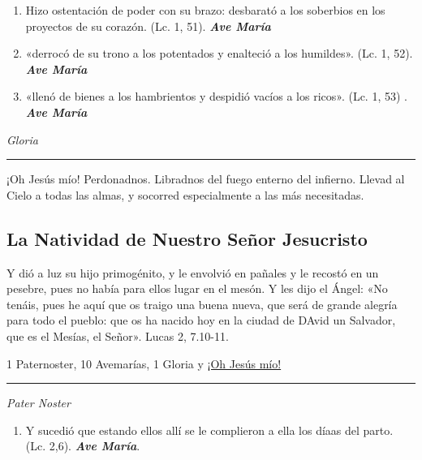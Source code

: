 \documentclass[a4paper,11pt, oneside]{report}
\begin{document}
{{\begin{enumerate}
      \item Hizo ostentación de poder con su brazo: desbarató a los soberbios en los proyectos de su corazón. (Lc. 1, 51). \textbf{\textit{Ave María}}

      \item «derrocó de su trono a los potentados y enalteció a los humildes». (Lc. 1, 52). \textbf{\textit{Ave María}}

      \item «llenó de bienes a los hambrientos y despidió vacíos a los ricos». (Lc. 1, 53) .    \textbf{\textit{Ave María}}
    \end{enumerate}

    \indent\textit{Gloria}

    \begin{center}\rule{1\linewidth}{\linethickness}\end{center}

    \hypertarget{finalVisitacion}{¡Oh Jesús mío! Perdonadnos. Libradnos del fuego enterno del infierno. Llevad al Cielo a todas las almas, y socorred especialmente a las más 
    necesitadas.}
  }
                      
  \subsection*{La Natividad de Nuestro Señor Jesucristo}
  {

    Y dió a luz su hijo primogénito, y le envolvió en pañales y le recostó en un pesebre, pues no había para ellos lugar en el mesón.
    Y les dijo el Ángel: «No tenáis, pues he aquí que os traigo una buena nueva, que será de grande alegría para todo el pueblo: que os ha nacido hoy en la ciudad de DAvid
    un Salvador, que es el Mesías, el Señor». Lucas 2, 7.10-11.
    
    \medskip
    
    1 Paternoster, 10 Avemarías, 1 Gloria y \hyperlink{finalNatividad}{¡Oh Jesús mío!}
    
    \medskip

    \begin{center}\rule{1\linewidth}{\linethickness}\end{center}

    \medskip
    \textit{Pater Noster} 

    \begin{enumerate}
      \item Y sucedió que estando ellos allí se le complieron a ella los díaas del parto. (Lc. 2,6). \textbf{\textit{Ave María}}.


\end{enumerate}}}
\end{document}
